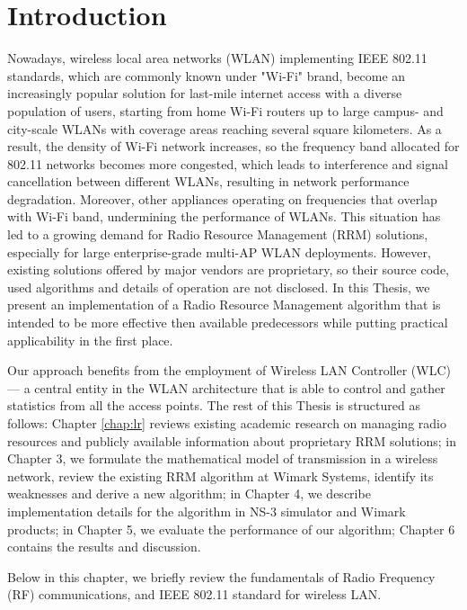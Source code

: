 \chapter{Introduction}
\label{chap:intro}

Nowadays, wireless local area networks (WLAN) implementing IEEE 802.11 standards, which are commonly known under "Wi-Fi" brand, become an increasingly popular solution for last-mile internet access with a diverse population of users, starting from home Wi-Fi routers up to large campus- and city-scale WLANs with coverage areas reaching several square kilometers.
As a result, the density of Wi-Fi network increases, so the frequency band allocated for 802.11 networks becomes more congested, which leads to interference and signal cancellation between different WLANs, resulting in network performance degradation.
Moreover, other appliances operating on frequencies that overlap with Wi-Fi band, undermining the performance of WLANs.
This situation has led to a growing demand for Radio Resource Management (RRM) solutions, especially for large enterprise-grade multi-AP WLAN deployments. However, existing solutions offered by major vendors are proprietary, so their source code, used algorithms and details of operation are not disclosed.
In this Thesis, we present an implementation of a Radio Resource Management algorithm that is intended to be more effective then available predecessors while putting practical applicability in the first place.

Our approach benefits from the employment of Wireless LAN Controller (WLC) — a central entity in the WLAN architecture that is able to control and gather statistics from all the access points.
The rest of this Thesis is structured as follows: Chapter \ref{chap:lr} reviews existing academic research on managing radio resources and publicly available information about proprietary RRM solutions; in Chapter 3, we formulate the mathematical model of transmission in a wireless network, review the existing RRM algorithm at Wimark Systems, identify its weaknesses and derive a new algorithm; in Chapter 4, we describe implementation details for the algorithm in NS-3 simulator and Wimark products; in Chapter 5, we evaluate the performance of our algorithm; Chapter 6 contains the results and discussion.

Below in this chapter, we briefly review the fundamentals of Radio Frequency (RF) communications, and IEEE 802.11 standard for wireless LAN.

